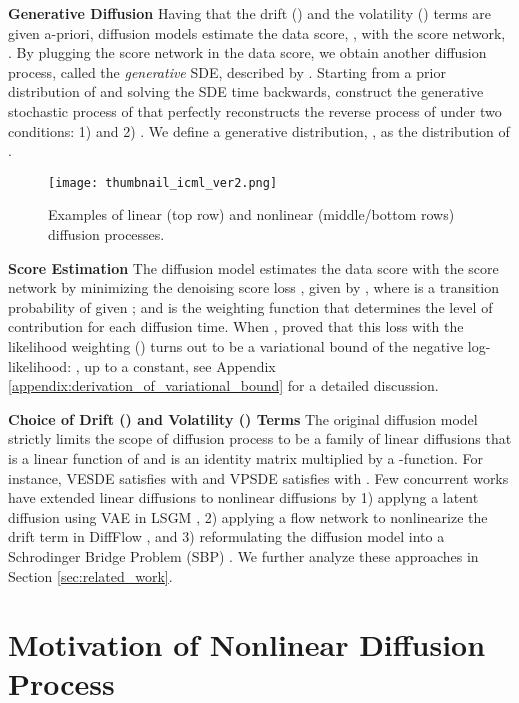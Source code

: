 \documentclass{article}
\theoremstyle{definition}
\theoremstyle{remark}
\begin{document}
	\textbf{Generative Diffusion} Having that the drift () and the volatility () terms are given a-priori, diffusion models \citep{song2020score} estimate the data score, , with the score network, . By plugging the score network in the data score, we obtain another diffusion process, called the \textit{generative} SDE, described by . Starting from a prior distribution of  and solving the SDE time backwards, \citet{song2020score} construct the generative stochastic process of  that perfectly reconstructs the reverse process of  under two conditions: 1)  and 2) . We define a generative distribution, , as the distribution of .
	
	\begin{figure*}[t]
\centering
		\texttt{[image: thumbnail\_icml\_ver2.png]}
		\caption{Examples of linear (top row) and nonlinear (middle/bottom rows) diffusion processes.}
		\label{fig:thumbnail_icml}
\end{figure*}
	
	\textbf{Score Estimation} The diffusion model estimates the data score with the score network by minimizing the denoising score loss \citep{song2020score}, given by , where  is a transition probability of  given ; and  is the weighting function that determines the level of contribution for each diffusion time. When , \citet{song2021maximum, huang2021variational} proved that this loss with the likelihood weighting () turns out to be a variational bound of the negative log-likelihood: , up to a constant, see Appendix \ref{appendix:derivation_of_variational_bound} for a detailed discussion.
	
	\textbf{Choice of Drift () and Volatility () Terms} The original diffusion model strictly limits the scope of diffusion process to be a family of linear diffusions that  is a linear function of  and  is an identity matrix multiplied by a -function. For instance, VESDE \citep{song2020score, song2020improved} satisfies  with  and VPSDE \citep{song2020score, ho2020denoising} satisfies  with . Few concurrent works have extended linear diffusions to nonlinear diffusions by 1) applyng a latent diffusion using VAE in LSGM \cite{vahdat2021score}, 2) applying a flow network to nonlinearize the drift term in DiffFlow \cite{zhang2021diffusion}, and 3) reformulating the diffusion model into a Schrodinger Bridge Problem (SBP) \cite{vargas2021solving,de2021diffusion,chen2021likelihood}. We further analyze these approaches in Section \ref{sec:related_work}. 
	
	\section{Motivation of Nonlinear Diffusion Process}\label{sec:motivation}
	
\end{document}
